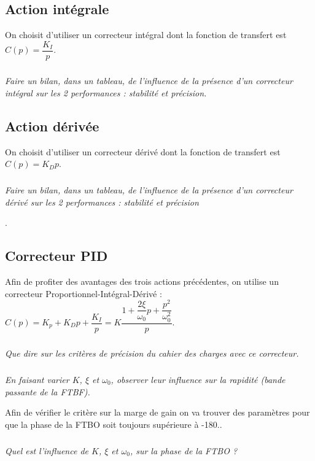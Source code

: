 \documentclass[10pt,fleqn]{article} %
\begin{document}
\begin{multicols}{2}
\subsection*{Action intégrale}
On choisit d’utiliser un correcteur intégral dont la fonction de transfert est  $C(p)=\dfrac{K_I}{p}$.
\subparagraph{}
\textit{Faire un bilan, dans un tableau, de l’influence de la présence d’un correcteur intégral sur les 2 performances : stabilité et précision.}
\ifprof
\begin{corrige}
\end{corrige}
\else
\fi

\subsection*{Action dérivée}
On choisit d’utiliser un correcteur dérivé dont la fonction de transfert est  $C(p)=K_Dp$.
\subparagraph{}
\textit{Faire un bilan, dans un tableau, de l’influence de la présence d’un correcteur dérivé sur les 2 performances : stabilité et précision}
\ifprof
\begin{corrige}
\end{corrige}
\else
\fi.

\subsection*{Correcteur PID}
Afin de profiter des avantages des trois actions précédentes, on utilise un correcteur Proportionnel-Intégral-Dérivé :
$C(p)=K_p+K_D p+\dfrac{K_I}{p}=K\dfrac{1+\dfrac{2\xi}{\omega_0}  p+\dfrac{p^2}{\omega_0^2}}{p}$.
  
\subparagraph{}
\textit{Que dire sur les critères de précision du cahier des charges avec ce correcteur.}
\ifprof
\begin{corrige}
\end{corrige}
\else
\fi

\subparagraph{}
\textit{En faisant varier $K$, $\xi$ et $\omega_0$, observer leur influence sur la rapidité (bande passante de la FTBF).}
\ifprof
\begin{corrige}
\end{corrige}
\else
\fi

Afin de vérifier le critère sur la marge de gain on va trouver des paramètres pour que la phase de la FTBO soit toujours supérieure à -180\degres..
\subparagraph{}
\textit{Quel est l’influence de $K$, $\xi$ et $\omega_0$, sur la phase de la FTBO ? }
\ifprof
\begin{corrige}
\end{corrige}
\else
\fi


\end{multicols}
\end{document}

